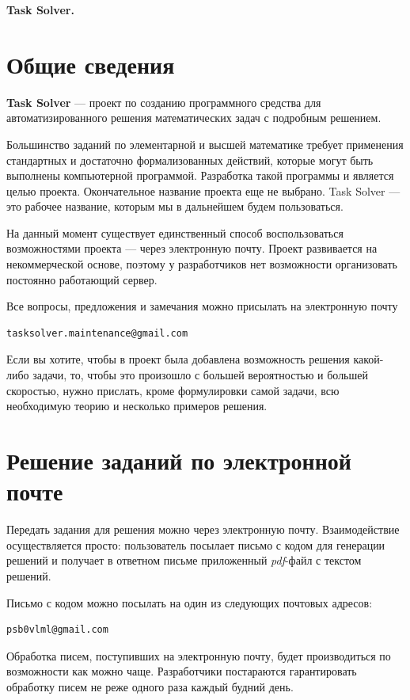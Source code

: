 \documentclass[12pt,a4paper]{article}
\begin{document}
\begin{center}\LARGE\bf
Task Solver.
\end{center}

\tableofcontents

\section{Общие сведения}

\textbf{Task Solver} --- проект по созданию программного средства для автоматизированного решения математических задач с подробным решением.

Большинство заданий по элементарной и высшей математике требует применения стандартных и достаточно формализованных действий, которые могут быть выполнены компьютерной программой. Разработка такой программы и является целью проекта. Окончательное название проекта еще не выбрано. Task Solver --- это рабочее название, которым мы в дальнейшем будем пользоваться.

На данный момент существует единственный способ воспользоваться возможностями проекта --- через электронную почту. Проект развивается на некоммерческой основе, поэтому у разработчиков нет возможности организовать постоянно работающий сервер.

Все вопросы, предложения и замечания можно присылать на электронную почту
\begin{verbatim}
tasksolver.maintenance@gmail.com
\end{verbatim}
Если вы хотите, чтобы в проект была добавлена возможность решения какой-либо задачи, то, чтобы это произошло с большей вероятностью и большей скоростью, нужно прислать, кроме формулировки самой задачи, всю необходимую теорию и несколько примеров решения.

\section{Решение заданий по электронной почте}

Передать задания для решения можно через электронную почту. Взаимодействие осуществляется просто: пользователь посылает письмо с кодом для генерации решений и получает в ответном письме приложенный \textit{pdf}-файл с текстом решений.

Письмо с кодом можно посылать на один из следующих почтовых адресов:
\begin{verbatim}
psb0vlml@gmail.com
\end{verbatim}
Обработка писем, поступивших на электронную почту, будет производиться по возможности как можно чаще. Разработчики постараются гарантировать обработку писем не реже одного раза каждый будний день.
\end{document}
